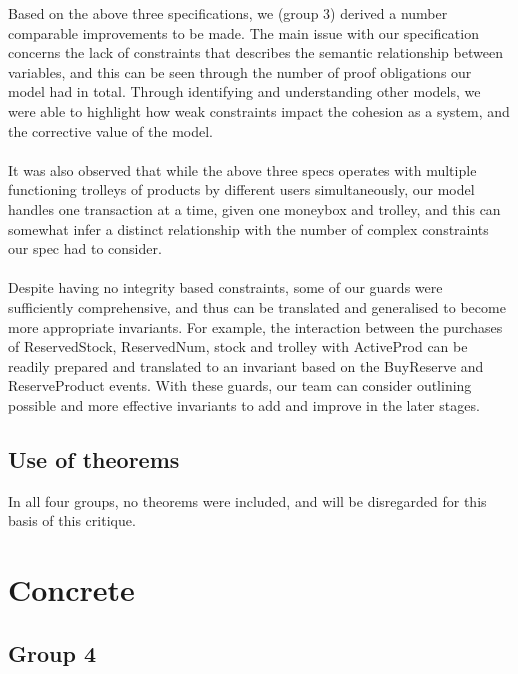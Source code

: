 Based on the above three specifications, we (group 3) derived a number comparable improvements to be made. The main issue with our specification concerns the lack of constraints that describes the semantic relationship between variables, and this can be seen through the number of proof obligations our model had in total. Through identifying and understanding other models, we were able to highlight how weak constraints impact the cohesion as a system, and the corrective value of the model.
 \\ \\ It was also observed that while the above three specs operates with multiple functioning trolleys of products by different users simultaneously, our model handles one transaction at a time, given one moneybox and trolley, and this can somewhat infer a distinct relationship with the number of complex constraints our spec had to consider.
 \\ \\ Despite having no integrity based constraints, some of our guards were sufficiently comprehensive, and thus can be translated and generalised to become more appropriate invariants. For example, the interaction between the purchases of ReservedStock, ReservedNum, stock and trolley with ActiveProd can be readily prepared and translated to an invariant based on the BuyReserve and ReserveProduct events. With these guards, our team can consider outlining possible and more effective invariants to add and improve in the later stages.

\subsection{Use of theorems}
\label{useoftheorems}

In all four groups, no theorems were included, and will be disregarded for this basis of this critique.

\section{Concrete}
\label{concrete}

\subsection{Group 4}
\label{group4}

